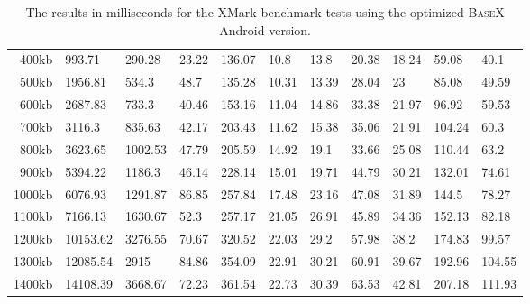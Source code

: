 \begin {table}[htpb]
\begin{tabular}{r|l|l|l|l|l|l|l|l|l|l}
400kb&993.71&290.28&23.22&136.07&10.8&13.8&20.38&18.24&59.08&40.1\\
500kb&1956.81&534.3&48.7&135.28&10.31&13.39&28.04&23&85.08&49.59\\
600kb&2687.83&733.3&40.46&153.16&11.04&14.86&33.38&21.97&96.92&59.53\\
700kb&3116.3&835.63&42.17&203.43&11.62&15.38&35.06&21.91&104.24&60.3\\
800kb&3623.65&1002.53&47.79&205.59&14.92&19.1&33.66&25.08&110.44&63.2\\
900kb&5394.22&1186.3&46.14&228.14&15.01&19.71&44.79&30.21&132.01&74.61\\
1000kb&6076.93&1291.87&86.85&257.84&17.48&23.16&47.08&31.89&144.5&78.27\\
1100kb&7166.13&1630.67&52.3&257.17&21.05&26.91&45.89&34.36&152.13&82.18\\
1200kb&10153.62&3276.55&70.67&320.52&22.03&29.2&57.98&38.2&174.83&99.57\\
1300kb&12085.54&2915&84.86&354.09&22.91&30.21&60.91&39.67&192.96&104.55\\
1400kb&14108.39&3668.67&72.23&361.54&22.73&30.39&63.53&42.81&207.18&111.93\\
\end{tabular}
\caption{The results in milliseconds for the XMark benchmark tests using the optimized \textsc{BaseX} Android version.}
\label{tab:xmark-tablet-optimized-appendice}
\end {table}


